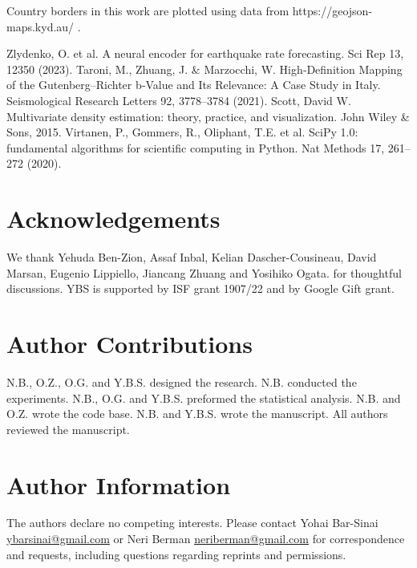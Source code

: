 \documentclass[pdflatex]{sn-jnl}
\begin{document}
Country borders in this work are plotted using data from https://geojson-maps.kyd.au/ .

\newpage
\renewcommand\refname{Methods References}
\begin{thebibliography}{10}
Zlydenko, O. et al. A neural encoder for earthquake rate forecasting. Sci Rep 13, 12350 (2023).
Taroni, M., Zhuang, J. \& Marzocchi, W. High‐Definition Mapping of the Gutenberg–Richter b‐Value and Its Relevance: A Case Study in Italy. Seismological Research Letters 92, 3778–3784 (2021).
Scott, David W. Multivariate density estimation: theory, practice, and visualization. John Wiley \& Sons, 2015.  
Virtanen, P., Gommers, R., Oliphant, T.E. et al. SciPy 1.0: fundamental algorithms for scientific computing in Python. Nat Methods 17, 261–272 (2020).





\end{thebibliography}


\newpage
\section*{Acknowledgements}
We thank Yehuda Ben-Zion, Assaf Inbal, Kelian Dascher-Cousineau, David Marsan, Eugenio Lippiello, Jiancang Zhuang and Yosihiko Ogata. for thoughtful discussions. YBS is supported by ISF grant 1907/22 and by Google Gift grant.

\section*{Author Contributions}
N.B., O.Z., O.G. and Y.B.S. designed the research. N.B. conducted the experiments. N.B., O.G. and Y.B.S. preformed the statistical analysis. N.B. and O.Z. wrote the code base. N.B. and Y.B.S. wrote the manuscript. All authors reviewed the manuscript.

\section*{Author Information}
The authors declare no competing interests. Please contact Yohai Bar-Sinai \href{mailto:ybarsinai@gmail.com}{ybarsinai@gmail.com} or Neri Berman \href{mailto:neriberman@gmail.com}{neriberman@gmail.com} for correspondence and requests, including questions regarding reprints and permissions.
\end{document}
